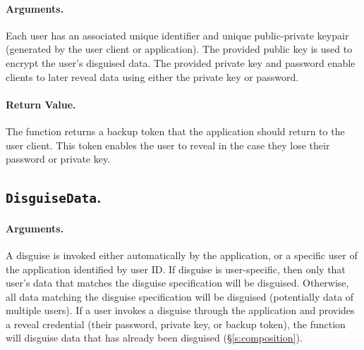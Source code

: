     \paragraph{Arguments.} Each user has an associated unique identifier and unique
    public-private keypair (generated by the user
    client or application).
    The provided public key is used to encrypt the user's disguised data. The
    provided private key and password enable clients to later reveal data using
    either the private key or password.

    \paragraph{Return Value.} 
    The function returns a backup token that the application should return to
    the user client. This token enables the user to reveal in the case they lose
    their password or private key.


\subsection{\texttt{DisguiseData}.}

\noindent{}

    \paragraph{Arguments.} 
    A disguise is invoked either automatically by the application, or a specific
    user of the application identified by user ID. 
    If disguise is user-specific, then only that user's data that matches the
    disguise specification will be disguised.  Otherwise, all data matching the
    disguise specification will be disguised (potentially data of multiple
    users). 
    If a user invokes a disguise through the application and provides a reveal
    credential (their password, private key, or backup token), the function 
    will disguise data
    that has already been disguised (\S\ref{s:composition}).

